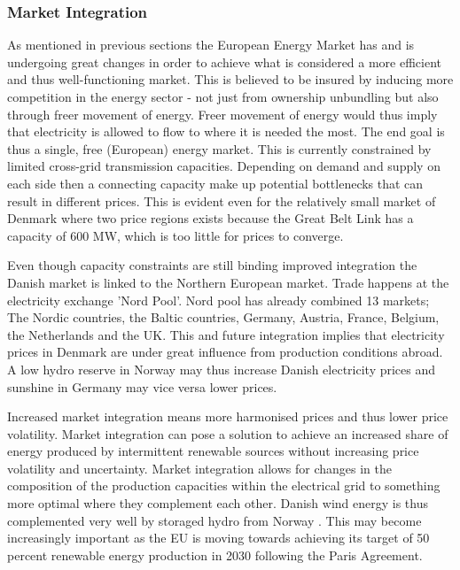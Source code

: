 \subsubsection{Market Integration}
\label{subsec:t_EU}
As mentioned in previous sections the European Energy Market has and is undergoing great changes in order to achieve what is considered a more efficient and thus well-functioning market. This is believed to be insured by inducing more competition in the energy sector - not just from ownership unbundling but also through freer movement of energy. Freer movement of energy would thus imply that electricity is allowed to flow to where it is needed the most. The end goal is thus a single, free (European) energy market. This is currently constrained by limited cross-grid transmission capacities. Depending on demand and supply on each side then a connecting capacity make up potential bottlenecks that can result in different prices.%
This is evident even for the relatively small market of Denmark where two price regions exists because the Great Belt Link has a capacity of 600 MW, which is too little for prices to converge.
\medskip

Even though capacity constraints are still binding improved integration the Danish market is linked to the Northern European market. Trade happens at the electricity exchange 'Nord Pool'. Nord pool has already combined 13 markets; The Nordic countries, the Baltic countries, Germany, Austria, France, Belgium, the Netherlands and the UK.  This and future integration implies that electricity prices in Denmark are under great influence from production conditions abroad. A low hydro reserve in Norway may thus increase Danish electricity prices and sunshine in Germany may vice versa lower prices.
\medskip

Increased market integration means more harmonised prices and thus lower price volatility. Market integration can pose a solution to achieve an increased share of energy produced by intermittent renewable sources without increasing price volatility and uncertainty. Market integration allows for changes in the composition of the production capacities within the electrical grid to something more optimal where they complement each other. Danish wind energy is thus complemented very well by storaged hydro from Norway \citep{ambec2012electricity}.  This may become increasingly important as the EU is moving towards achieving its target of 50 percent renewable energy production in 2030 following the Paris Agreement.

